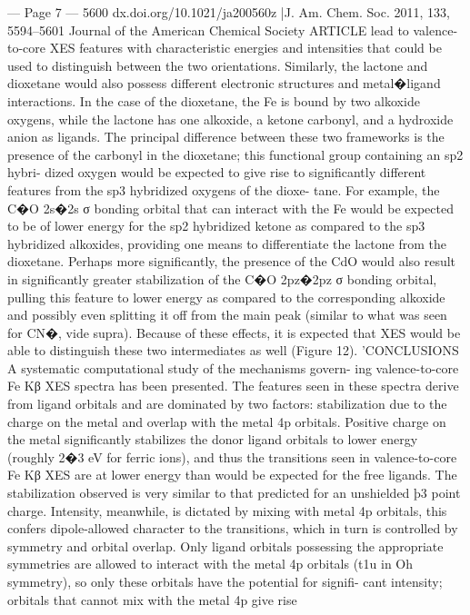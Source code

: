 --- Page 7 ---
5600
dx.doi.org/10.1021/ja200560z |J. Am. Chem. Soc. 2011, 133, 5594–5601
Journal of the American Chemical Society
ARTICLE
lead to valence-to-core XES features with characteristic energies
and intensities that could be used to distinguish between the two
orientations.
Similarly, the lactone and dioxetane would also possess
diﬀerent electronic structures and metal�ligand interactions.
In the case of the dioxetane, the Fe is bound by two alkoxide
oxygens, while the lactone has one alkoxide, a ketone carbonyl,
and a hydroxide anion as ligands. The principal diﬀerence
between these two frameworks is the presence of the carbonyl
in the dioxetane; this functional group containing an sp2 hybri-
dized oxygen would be expected to give rise to signiﬁcantly
diﬀerent features from the sp3 hybridized oxygens of the dioxe-
tane. For example, the C�O 2s�2s σ bonding orbital that can
interact with the Fe would be expected to be of lower energy for
the sp2 hybridized ketone as compared to the sp3 hybridized
alkoxides, providing one means to diﬀerentiate the lactone from
the dioxetane. Perhaps more signiﬁcantly, the presence of the
CdO would also result in signiﬁcantly greater stabilization of the
C�O 2pz�2pz σ bonding orbital, pulling this feature to lower
energy as compared to the corresponding alkoxide and possibly
even splitting it oﬀ from the main peak (similar to what was seen
for CN�, vide supra). Because of these eﬀects, it is expected that
XES would be able to distinguish these two intermediates as well
(Figure 12).
’CONCLUSIONS
A systematic computational study of the mechanisms govern-
ing valence-to-core Fe Kβ XES spectra has been presented. The
features seen in these spectra derive from ligand orbitals and are
dominated by two factors: stabilization due to the charge on the
metal and overlap with the metal 4p orbitals. Positive charge on
the metal signiﬁcantly stabilizes the donor ligand orbitals to lower
energy (roughly 2�3 eV for ferric ions), and thus the transitions
seen in valence-to-core Fe Kβ XES are at lower energy than
would be expected for the free ligands. The stabilization observed
is very similar to that predicted for an unshielded þ3 point
charge. Intensity, meanwhile, is dictated by mixing with metal 4p
orbitals, this confers dipole-allowed character to the transitions,
which in turn is controlled by symmetry and orbital overlap.
Only ligand orbitals possessing the appropriate symmetries are
allowed to interact with the metal 4p orbitals (t1u in Oh
symmetry), so only these orbitals have the potential for signiﬁ-
cant intensity; orbitals that cannot mix with the metal 4p give rise

